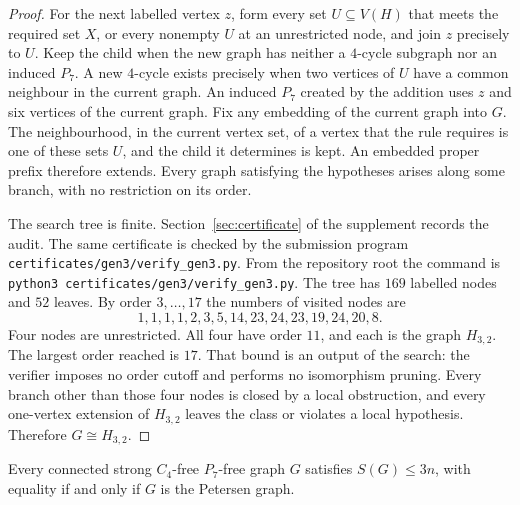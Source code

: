 \documentclass[ASNA]{USG}
\theoremstyle{WBstyletwo}
\numberwithin{equation}{section}
\begin{document}
\begin{proof}
For the next labelled vertex $z$, form every set $U\subseteq V(H)$ that meets the required set $X$, or every nonempty $U$ at an unrestricted node, and join $z$ precisely to $U$. Keep the child when the new graph has neither a $4$-cycle subgraph nor an induced $P_7$. A new $4$-cycle exists precisely when two vertices of $U$ have a common neighbour in the current graph. An induced $P_7$ created by the addition uses $z$ and six vertices of the current graph. Fix any embedding of the current graph into $G$. The neighbourhood, in the current vertex set, of a vertex that the rule requires is one of these sets $U$, and the child it determines is kept. An embedded proper prefix therefore extends. Every graph satisfying the hypotheses arises along some branch, with no restriction on its order.

The search tree is finite. Section~\ref{sec:certificate} of the supplement records the audit. The same certificate is checked by the submission program \texttt{certificates/gen3/verify\_gen3.py}. From the repository root the command is \texttt{python3 certificates/gen3/verify\_gen3.py}. The tree has $169$ labelled nodes and $52$ leaves. By order $3,\dots,17$ the numbers of visited nodes are
\[
1,1,1,1,2,3,5,14,23,24,23,19,24,20,8.
\]
Four nodes are unrestricted. All four have order $11$, and each is the graph $H_{3,2}$. The largest order reached is $17$. That bound is an output of the search: the verifier imposes no order cutoff and performs no isomorphism pruning. Every branch other than those four nodes is closed by a local obstruction, and every one-vertex extension of $H_{3,2}$ leaves the class or violates a local hypothesis. Therefore $G\cong H_{3,2}$.
\end{proof}

\begin{theorem}\label{thm:gen3}
Every connected strong $C_4$-free $P_7$-free graph $G$ satisfies $S(G)\le 3n$, with equality if and only if $G$ is the Petersen graph.
\end{theorem}
\end{document}
